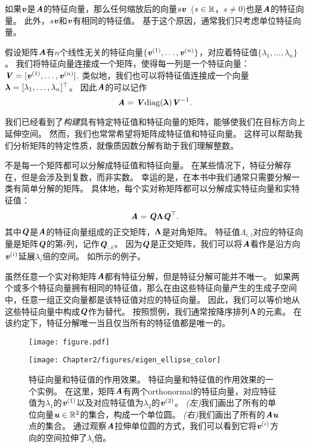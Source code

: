 如果$\boldsymbol{\mathit{v}}$是$\boldsymbol{\mathit{A}}$的特征向量，那么任何缩放后的向量$s\boldsymbol{\mathit{v}}$~($s\in \mathbb{R}$，$s\neq 0$)也是$\boldsymbol{\mathit{A}}$的特征向量。
此外，$s\boldsymbol{\mathit{v}}$和$\boldsymbol{\mathit{v}}$有相同的特征值。
基于这个原因，通常我们只考虑单位特征向量。


假设矩阵$\boldsymbol{\mathit{A}}$有$n$个线性无关的特征向量$\{\boldsymbol{\mathit{v}}^{(1)}, \dots, \boldsymbol{\mathit{v}}^{(n)}\}$，对应着特征值$\{\lambda_1, \dots , \lambda_n \}$。
我们将特征向量连接成一个矩阵，使得每一列是一个特征向量：$\boldsymbol{\mathit{V}}=[\boldsymbol{\mathit{v}}^{(1)}, \dots, \boldsymbol{\mathit{v}}^{(n)}]$.
类似地，我们也可以将特征值连接成一个向量$\boldsymbol{\lambda} = [\lambda_1, \dots , \lambda_n]^\top$。
因此$\boldsymbol{\mathit{A}}$的可以记作
\begin{equation}
    \boldsymbol{\mathit{A}} = \boldsymbol{\mathit{V}} \text{diag}(\boldsymbol{\lambda}) \boldsymbol{\mathit{V}}^{-1}.
\end{equation}


我们已经看到了\emph{构建}具有特定特征值和特征向量的矩阵，能够使我们在目标方向上延伸空间。
然而，我们也常常希望将矩阵成特征值和特征向量。
这样可以帮助我们分析矩阵的特定性质，就像质因数分解有助于我们理解整数。


不是每一个矩阵都可以分解成特征值和特征向量。
在某些情况下，特征分解存在，但是会涉及到复数，而非实数。
幸运的是，在本书中我们通常只需要分解一类有简单分解的矩阵。
具体地，每个实对称矩阵都可以分解成实特征向量和实特征值：
\begin{equation}
    \boldsymbol{\mathit{A}} = \boldsymbol{\mathit{Q}} \boldsymbol{\Lambda} \boldsymbol{\mathit{Q}}^\top.
\end{equation}
其中$\boldsymbol{\mathit{Q}}$是$\boldsymbol{\mathit{A}}$的特征向量组成的正交矩阵，$\boldsymbol{\Lambda}$是对角矩阵。
特征值$\Lambda_{i,i}$对应的特征向量是矩阵$\boldsymbol{\mathit{Q}}$的第$i$列，记作$\boldsymbol{\mathit{Q}}_{:,i}$。
因为$\boldsymbol{\mathit{Q}}$是正交矩阵，我们可以将$\boldsymbol{\mathit{A}}$看作是沿方向$\boldsymbol{\mathit{v}}^{(i)}$延展$\lambda_i$倍的空间。
如所示的例子。


虽然任意一个实对称矩阵$\boldsymbol{\mathit{A}}$都有特征分解，但是特征分解可能并不唯一。
如果两个或多个特征向量拥有相同的特征值，那么在由这些特征向量产生的生成子空间中，任意一组正交向量都是该特征值对应的特征向量。
因此，我们可以等价地从这些特征向量中构成$\boldsymbol{\mathit{Q}}$作为替代。
按照惯例，我们通常按降序排列$\boldsymbol{\Lambda}$的元素。
在该约定下，特征分解唯一当且仅当所有的特征值都是唯一的。

\begin{figure}[!htb]
\ifOpenSource
\centerline{\texttt{[image: figure.pdf]}}
\else
\centerline{\texttt{[image: Chapter2/figures/eigen\_ellipse\_color]}}
\fi
\caption{特征向量和特征值的作用效果。
特征向量和特征值的作用效果的一个实例。
在这里，矩阵$\boldsymbol{\mathit{A}}$有两个\gls{orthonormal}的特征向量，对应特征值为$\lambda_1$的$\boldsymbol{\mathit{v}}^{(1)}$以及对应特征值为$\lambda_2$的$\boldsymbol{\mathit{v}}^{(2)}$。
\emph{(左)}我们画出了所有的单位向量$\boldsymbol{\mathit{u}}\in\mathbb{R}^2$的集合，构成一个单位圆。
\emph{(右)}我们画出了所有的$\boldsymbol{\mathit{A}}\boldsymbol{\mathit{u}}$点的集合。
通过观察$\boldsymbol{\mathit{A}}$拉伸单位圆的方式，我们可以看到它将$\boldsymbol{\mathit{v}}^{(i)}$方向的空间拉伸了$\lambda_i$倍。	}
\label{fig:chap2_eigen_ellipse}
\end{figure}

